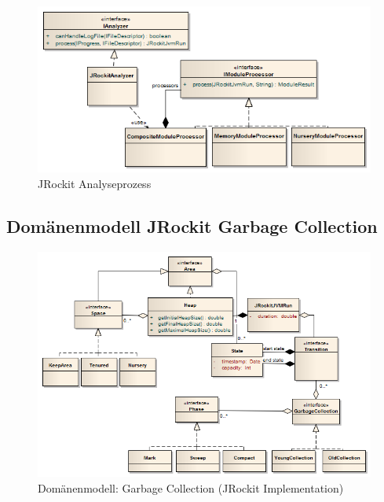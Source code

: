  \begin{figure}[H]
  	\centering
        	\caption{JRockit Analyseprozess}
    	\includegraphics[width=16cm]{images/jrockit_log_processing}
\end{figure}

\subsection{Domänenmodell JRockit Garbage Collection}
\begin{landscape}
 \begin{figure}[H]
  	\centering
        	\caption{Domänenmodell: Garbage Collection (JRockit Implementation)}
    	\includegraphics[width=19.5cm]{images/jrockit_extension_domain}
\end{figure}
\end{landscape}

